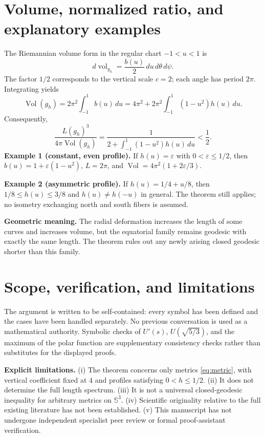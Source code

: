 \documentclass[11pt,a4paper]{article}
\theoremstyle{remark}\newtheorem{remark}[theorem]{Remark}
\newcommand{\Sthree}{\mathbb S^3}\newcommand{\R}{\mathbb R}\newcommand{\C}{\mathbb C}\newcommand{\Z}{\mathbb Z}
\newcommand{\Vol}{\operatorname{Vol}}\newcommand{\Len}{\operatorname{Length}}\newcommand{\sgn}{\operatorname{sgn}}
\begin{document}
\section{Volume, normalized ratio, and explanatory examples}
The Riemannian volume form in the regular chart $-1<u<1$ is
\[
d\operatorname{vol}_{g_h}=\frac{b(u)}2\,du\,d\theta\,d\psi.
\]
The factor $1/2$ corresponds to the vertical scale $c=2$; each angle has period $2\pi$. Integrating yields
\begin{equation}\label{eq:volume}
\boxed{\Vol(g_h)=2\pi^2\int_{-1}^{1}b(u)\,du
=4\pi^2+2\pi^2\int_{-1}^{1}(1-u^2)h(u)\,du.}
\end{equation}
Consequently,
\begin{equation}\label{eq:ratio}
\boxed{\frac{L(g_h)^3}{4\pi\Vol(g_h)}
=\frac{1}{2+\int_{-1}^{1}(1-u^2)h(u)\,du}<\frac12.}
\end{equation}
\textbf{Example 1 (constant, even profile).} If $h(u)=\varepsilon$ with $0<\varepsilon\le1/2$, then $b(u)=1+\varepsilon(1-u^2)$, $L=2\pi$, and $\Vol=4\pi^2(1+2\varepsilon/3)$.

\textbf{Example 2 (asymmetric profile).} If $h(u)=1/4+u/8$, then $1/8\le h(u)\le3/8$ and $h(u)\ne h(-u)$ in general. The theorem still applies; no isometry exchanging north and south fibers is assumed.

\textbf{Geometric meaning.} The radial deformation increases the length of some curves and increases volume, but the equatorial family remains geodesic with exactly the same length. The theorem rules out any newly arising closed geodesic shorter than this family.

\section{Scope, verification, and limitations}
The argument is written to be self-contained: every symbol has been defined and the cases have been handled separately. No previous conversation is used as a mathematical authority. Symbolic checks of $U'(s)$, $U(\sqrt{5/3})$, and the maximum of the polar function are supplementary consistency checks rather than substitutes for the displayed proofs.

\textbf{Explicit limitations.} (i) The theorem concerns only metrics \eqref{eq:metric}, with vertical coefficient fixed at $4$ and profiles satisfying $0<h\le1/2$. (ii) It does not determine the full length spectrum. (iii) It is not a universal closed-geodesic inequality for arbitrary metrics on $\Sthree$. (iv) Scientific originality relative to the full existing literature has not been established. (v) This manuscript has not undergone independent specialist peer review or formal proof-assistant verification.
\end{document}
